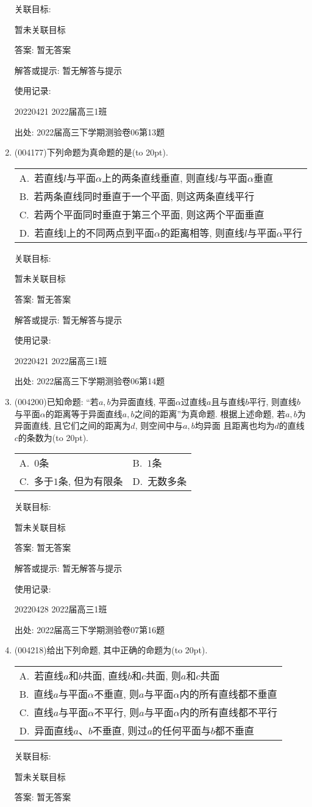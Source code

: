 \documentclass[10pt,a4paper]{article}
\newcommand{\bracket}[1]{(\hbox to #1pt{})}
\newcommand{\onech}[4]{\par\begin{tabular}{p{.9\textwidth}}
A.~#1\\
B.~#2\\
C.~#3\\
D.~#4
\end{tabular}}
\newcommand{\twoch}[4]{\par\begin{tabular}{p{.46\textwidth}p{.46\textwidth}}
A.~#1& B.~#2\\
C.~#3& D.~#4
\end{tabular}}
\begin{document}
\begin{enumerate}[1.]
关联目标:

暂未关联目标

答案: 暂无答案

解答或提示: 暂无解答与提示

使用记录:

20220421	2022届高三1班	


出处: 2022届高三下学期测验卷06第13题
\item { (004177)}下列命题为真命题的是\bracket{20}.
\onech{若直线$l$与平面$\alpha$上的两条直线垂直, 则直线$l$与平面$\alpha$垂直}{若两条直线同时垂直于一个平面, 则这两条直线平行}{若两个平面同时垂直于第三个平面, 则这两个平面垂直}{若直线l上的不同两点到平面$\alpha$的距离相等, 则直线$l$与平面$\alpha$平行}


关联目标:

暂未关联目标

答案: 暂无答案

解答或提示: 暂无解答与提示

使用记录:

20220421	2022届高三1班	


出处: 2022届高三下学期测验卷06第14题
\item { (004200)}已知命题: ``若$a,b$为异面直线, 平面$\alpha$过直线$a$且与直线$b$平行, 则直线$b$与平面$\alpha$的距离等于异面直线$a,b$之间的距离''为真命题.
根据上述命题, 若$a,b$为异面直线, 且它们之间的距离为$d$, 则空间中与$a,b$均异面
且距离也均为$d$的直线$c$的条数为\bracket{20}.
\twoch{$0$条}{$1$条}{多于$1$条, 但为有限条}{无数多条}


关联目标:

暂未关联目标

答案: 暂无答案

解答或提示: 暂无解答与提示

使用记录:

20220428	2022届高三1班	


出处: 2022届高三下学期测验卷07第16题
\item { (004218)}给出下列命题, 其中正确的命题为\bracket{20}.
\onech{若直线$a$和$b$共面, 直线$b$和$c$共面, 则$a$和$c$共面}{直线$a$与平面$\alpha$不垂直, 则$a$与平面$\alpha$内的所有直线都不垂直}{直线$a$与平面$\alpha$不平行, 则$a$与平面$\alpha$内的所有直线都不平行}{异面直线$a$、$b$不垂直, 则过$a$的任何平面与$b$都不垂直}


关联目标:

暂未关联目标

答案: 暂无答案


\end{enumerate}
\end{document}
